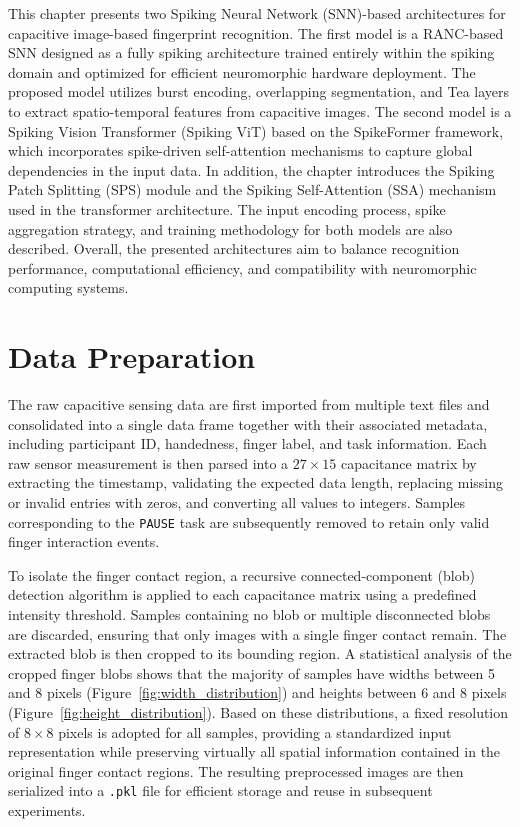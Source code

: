 \documentclass[../main.tex]{subfiles}
\begin{document}
This chapter presents two Spiking Neural Network (SNN)-based architectures for capacitive image-based fingerprint recognition. The first model is a RANC-based SNN designed as a fully spiking architecture trained entirely within the spiking domain and optimized for efficient neuromorphic hardware deployment. The proposed model utilizes burst encoding, overlapping segmentation, and Tea layers to extract spatio-temporal features from capacitive images. The second model is a Spiking Vision Transformer (Spiking ViT) based on the SpikeFormer framework, which incorporates spike-driven self-attention mechanisms to capture global dependencies in the input data. In addition, the chapter introduces the Spiking Patch Splitting (SPS) module and the Spiking Self-Attention (SSA) mechanism used in the transformer architecture. The input encoding process, spike aggregation strategy, and training methodology for both models are also described. Overall, the presented architectures aim to balance recognition performance, computational efficiency, and compatibility with neuromorphic computing systems.
\section{Data Preparation}

The raw capacitive sensing data are first imported from multiple text files and consolidated into a single data frame together with their associated metadata, including participant ID, handedness, finger label, and task information. Each raw sensor measurement is then parsed into a $27 \times 15$ capacitance matrix by extracting the timestamp, validating the expected data length, replacing missing or invalid entries with zeros, and converting all values to integers. Samples corresponding to the \texttt{PAUSE} task are subsequently removed to retain only valid finger interaction events.

To isolate the finger contact region, a recursive connected-component (blob)
detection algorithm is applied to each capacitance matrix using a predefined
intensity threshold. Samples containing no blob or multiple disconnected blobs
are discarded, ensuring that only images with a single finger contact remain.
The extracted blob is then cropped to its bounding region. A statistical analysis
of the cropped finger blobs shows that the majority of samples have widths
between 5 and 8 pixels (Figure~\ref{fig:width_distribution}) and heights between
6 and 8 pixels (Figure~\ref{fig:height_distribution}). Based on these
distributions, a fixed resolution of $8 \times 8$ pixels is adopted for all samples,
providing a standardized input representation while preserving virtually all
spatial information contained in the original finger contact regions. The resulting
preprocessed images are then serialized into a \texttt{.pkl} file for efficient
storage and reuse in subsequent experiments.
\end{document}
